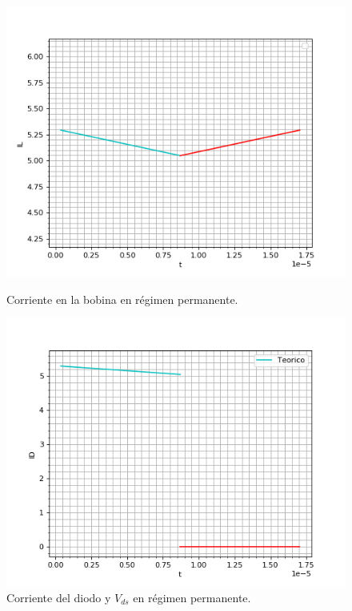 \begin{figure}[H]
	\centering
	\begin{minipage}{0.495\textwidth}
		\centering
		\includegraphics[width=\textwidth]{ImagenesEjercicio-1/IL_permanente} %
		\caption{Corriente en la bobina en régimen permanente.}
		\label{ej1:fig:il_permanente}
	\end{minipage}\hfill
	\begin{minipage}{0.495\textwidth}
		\centering
		\includegraphics[width=\textwidth]{ImagenesEjercicio-1/ID_apagado_a_encendido} %
		\caption{Corriente del diodo y $V_{ds}$ en régimen permanente.}
		\label{ej1:fig:idiodo_permanente}
	\end{minipage}
\end{figure}


